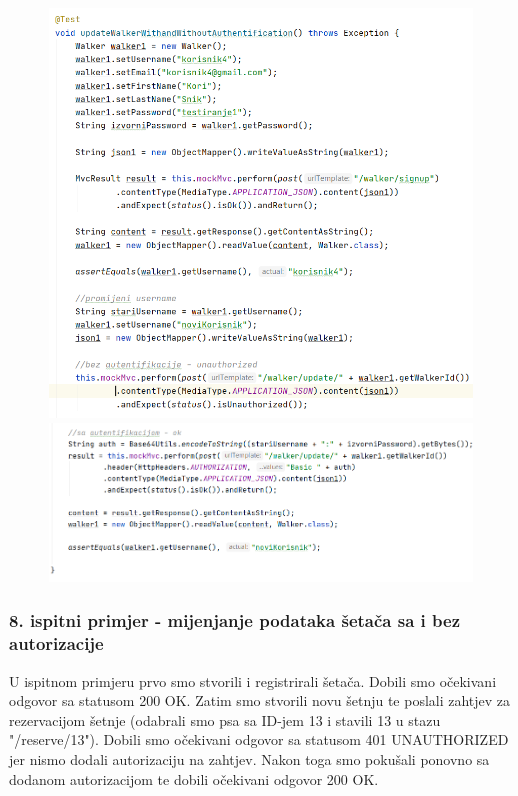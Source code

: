 			
			
			\begin{figure}[H]
				\hspace*{-0.58in}
				\includegraphics[scale=0.73]{slike/walker3.1.PNG}
				\hspace*{-0.41in}
				\includegraphics[scale=0.73]{slike/walker3.2.PNG} %
				\centering
			\end{figure}
			
			
			\subsubsection{8. ispitni primjer - mijenjanje podataka šetača sa i bez autorizacije }
			
			U ispitnom primjeru prvo smo stvorili i registrirali  šetača. Dobili smo očekivani odgovor sa statusom 200 OK.  Zatim smo stvorili novu šetnju te poslali zahtjev za rezervacijom šetnje (odabrali smo psa sa ID-jem 13 i stavili 13 u stazu "/reserve/13"). Dobili smo očekivani odgovor sa statusom 401 UNAUTHORIZED jer nismo dodali autorizaciju na zahtjev. Nakon toga smo pokušali ponovno sa dodanom autorizacijom te dobili očekivani odgovor 200 OK. 
			
